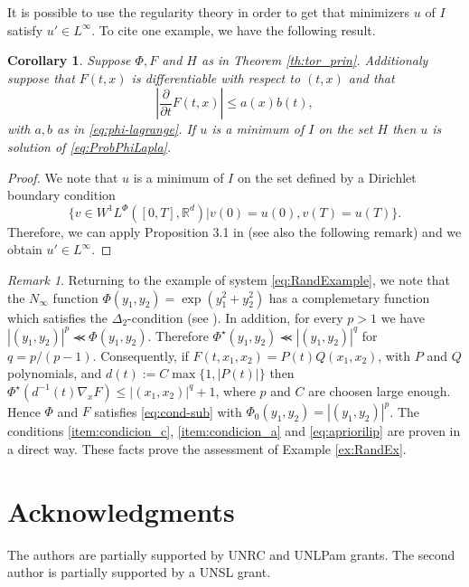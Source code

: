 \documentclass[twoside]{article}
\newtheorem{cor}[thm]{Corollary}
\theoremstyle{remark}
\newtheorem{comentario}{Remark}
\newcounter{example}[section]
\newcommand{\lphi}{L^{\Phi}}
\newcommand{\wphi}{W^{1}\lphi}
\newcommand{\rr}{\mathbb{R}}
\renewcommand{\leq}{\leqslant}
\newcommand{\Phie}{\Phi^{\star}}
\begin{document}
It is possible to use the regularity theory in order to get  that minimizers $u$ of $I$ satisfy $u'\in L^{\infty}$. To cite one example, we have the following result.

\begin{cor} Suppose $\Phi,F$ and $H$  as in Theorem \ref{th:tor_prin}. Additionaly suppose that
$F(t,x)$ is differentiable with respect to $(t,x)$ and that 
\begin{equation}\label{eq:apriorilip}\left| \frac{\partial}{\partial t} F(t,x)\right|  \leq a(x)b(t),\end{equation}
with $a,b$ as in \eqref{eq:phi-lagrange}. 
 If $u$ is a minimum of $I$ on the set $H$ then $u$ is solution of \eqref{eq:ProbPhiLapla}. 
 
\end{cor}

\begin{proof} We note that $u$ is a minimum of $I$ on the set defined by a Dirichlet boundary condition
\[\{v\in\wphi([0,T],\rr^d)| v(0)=u(0), v(T)=u(T)\}.\]
Therefore, we can apply Proposition 3.1 in \cite{clarke1985regularity} (see also the following remark) and we obtain $u'\in L^{\infty}$.
\end{proof}

\begin{comentario}\label{com:ejemplo} Returning to the example of  system \eqref{eq:RandExample},
we note that the $N_{\infty}$ function $\Phi(y_1,y_2)=\exp(y_1^2+y_2^2)$ has a  complemetary function which satisfies the $\Delta_2$-condition (see \cite[p. 28]{KR}).  In addition, for every $p>1$ we have $|(y_1,y_2)|^p \llcurly \Phi(y_1,y_2)$. Therefore $\Phie(y_1,y_2)\llcurly|(y_1,y_2)|^q $ for $q=p/(p-1)$. Consequently,  if $F(t,x_1,x_2)=P(t)Q(x_1,x_2)$, with $P$ and $Q$ polynomials, and $d(t):=C\max\{1,|P(t)|\}$  then $\Phie(d^{-1}(t)\nabla_xF)\leq |(x_1,x_2)|^q+1$,  where $p$ and $C$ are choosen large enough. Hence $\Phi$ and $F$ satisfies \eqref{eq:cond-sub} with $\Phi_0(y_1,y_2)=|(y_1,y_2)|^p$.  The conditions  \ref{item:condicion_c}, \ref{item:condicion_a}  and \eqref{eq:apriorilip} are proven in a direct way. These facts prove the assessment of Example \ref{ex:RandEx}.  
 
\end{comentario}

\section*{Acknowledgments}
The authors are partially supported by  UNRC and UNLPam grants. The second author is  partially supported by a  UNSL grant. 




% 
 
 

\end{document}
